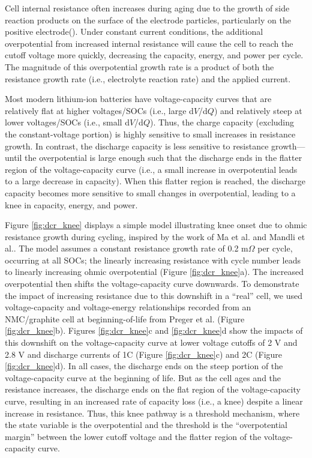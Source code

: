 \documentclass[journal=jpclcd,manuscript=article]{achemso}
\begin{document}
Cell internal resistance often increases during aging due to the growth of side reaction products on the surface of the electrode particles, particularly on the positive electrode(). Under constant current conditions, the additional overpotential from increased internal resistance will cause the cell to reach the cutoff voltage more quickly, decreasing the capacity, energy, and power per cycle. The magnitude of this overpotential growth rate is a product of both the resistance growth rate (i.e., electrolyte reaction rate) and the applied current.

Most modern lithium-ion batteries have voltage-capacity curves that are relatively flat at higher voltages/SOCs (i.e., large d$V$/d$Q$) and relatively steep at lower voltages/SOCs (i.e., small d$V$/d$Q$). Thus, the charge capacity (excluding the constant-voltage portion) is highly sensitive to small increases in resistance growth. In contrast, the discharge capacity is less sensitive to resistance growth---until the overpotential is large enough such that the discharge ends in the flatter region of the voltage-capacity curve (i.e., a small increase in overpotential leads to a large decrease in capacity). When this flatter region is reached, the discharge capacity becomes more sensitive to small changes in overpotential, leading to a knee in capacity, energy, and power.

Figure \ref{fig:dcr_knee} displays a simple model illustrating knee onset due to ohmic resistance growth during cycling, inspired by the work of Ma et al.\cite{ma_editors_2019} and Mandli et al.\cite{mandli_analysis_2019}. The model assumes a constant resistance growth rate of 0.2 m$\Omega$ per cycle, occurring at all SOCs; the linearly increasing resistance with cycle number leads to linearly increasing ohmic overpotential (Figure \ref{fig:dcr_knee}a). The increased overpotential then shifts the voltage-capacity curve downwards.
To demonstrate the impact of increasing resistance due to this downshift in a ``real'' cell, we used voltage-capacity and voltage-energy relationships recorded from an NMC/graphite cell at beginning-of-life from Preger et al.\cite{preger_degradation_2020} (Figure \ref{fig:dcr_knee}b). Figures \ref{fig:dcr_knee}c and \ref{fig:dcr_knee}d show the impacts of this downshift on the voltage-capacity curve at lower voltage cutoffs of 2 V and 2.8 V and discharge currents of 1C (Figure \ref{fig:dcr_knee}c) and 2C (Figure \ref{fig:dcr_knee}d). In all cases, the discharge ends on the steep portion of the voltage-capacity curve at the beginning of life. But as the cell ages and the resistance increases, the discharge ends on the flat region of the voltage-capacity curve, resulting in an increased rate of capacity loss (i.e., a knee) despite a linear increase in resistance. Thus, this knee pathway is a threshold mechanism, where the state variable is the overpotential and the threshold is the ``overpotential margin'' between the lower cutoff voltage and the flatter region of the voltage-capacity curve.
\end{document}
